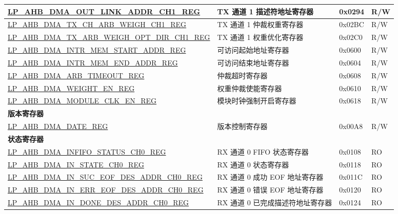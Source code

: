 \begin{longtable}{ | l | l | p{1.3cm} | l | }
\hyperref[regdesc:LPAHBDMAOUTLINKADDRCHNREG]{LP\_AHB\_DMA\_OUT\_LINK\_ADDR\_CH1\_REG} & TX 通道 1 描述符地址寄存器 & 0x0294 & R/W \\ \hline
\hyperref[regdesc:LPAHBDMATXCHARBWEIGHCHNREG]{LP\_AHB\_DMA\_TX\_CH\_ARB\_WEIGH\_CH1\_REG} & TX 通道 1 仲裁权重寄存器 & 0x02BC & R/W \\ \hline
\hyperref[regdesc:LPAHBDMATXARBWEIGHOPTDIRCHNREG]{LP\_AHB\_DMA\_TX\_ARB\_WEIGH\_OPT\_DIR\_CH1\_REG} & TX 通道 1 权重优化寄存器 & 0x02C0 & R/W \\ \hline
\hyperref[regdesc:LPAHBDMAINTRMEMSTARTADDRREG]{LP\_AHB\_DMA\_INTR\_MEM\_START\_ADDR\_REG} & 可访问起始地址寄存器 & 0x0600 & R/W \\ \hline
\hyperref[regdesc:LPAHBDMAINTRMEMENDADDRREG]{LP\_AHB\_DMA\_INTR\_MEM\_END\_ADDR\_REG} & 可访问结束地址寄存器 & 0x0604 & R/W \\ \hline
\hyperref[regdesc:LPAHBDMAARBTIMEOUTREG]{LP\_AHB\_DMA\_ARB\_TIMEOUT\_REG} & 仲裁超时寄存器 & 0x0608 & R/W \\ \hline
\hyperref[regdesc:LPAHBDMAWEIGHTENREG]{LP\_AHB\_DMA\_WEIGHT\_EN\_REG} & 权重仲裁使能寄存器 & 0x0610 & R/W \\ \hline
\hyperref[regdesc:LPAHBDMAMODULECLKENREG]{LP\_AHB\_DMA\_MODULE\_CLK\_EN\_REG} & 模块时钟强制开启寄存器 & 0x0618 & R/W \\ \hline
\multicolumn{4}{|l|}{\textbf{版本寄存器}} \\ \hline
\hyperref[regdesc:LPAHBDMADATEREG]{LP\_AHB\_DMA\_DATE\_REG} & 版本控制寄存器 & 0x00A8 & R/W \\ \hline
\multicolumn{4}{|l|}{\textbf{状态寄存器}} \\ \hline
\hyperref[regdesc:LPAHBDMAINFIFOSTATUSCHNREG]{LP\_AHB\_DMA\_INFIFO\_STATUS\_CH0\_REG} & RX 通道 0 FIFO 状态寄存器 & 0x0108 & RO \\ \hline
\hyperref[regdesc:LPAHBDMAINSTATECHNREG]{LP\_AHB\_DMA\_IN\_STATE\_CH0\_REG} & RX 通道 0 状态寄存器 & 0x0118 & RO \\ \hline
\hyperref[regdesc:LPAHBDMAINSUCEOFDESADDRCHNREG]{LP\_AHB\_DMA\_IN\_SUC\_EOF\_DES\_ADDR\_CH0\_REG} & RX 通道 0 成功 EOF 地址寄存器 & 0x011C & RO \\ \hline
\hyperref[regdesc:LPAHBDMAINERREOFDESADDRCHNREG]{LP\_AHB\_DMA\_IN\_ERR\_EOF\_DES\_ADDR\_CH0\_REG} & RX 通道 0 错误 EOF 地址寄存器 & 0x0120 & RO \\ \hline
\hyperref[regdesc:LPAHBDMAINDONEDESADDRCHNREG]{LP\_AHB\_DMA\_IN\_DONE\_DES\_ADDR\_CH0\_REG} & RX 通道 0 已完成描述符地址寄存器 & 0x0124 & RO \\ \hline

\end{longtable}
